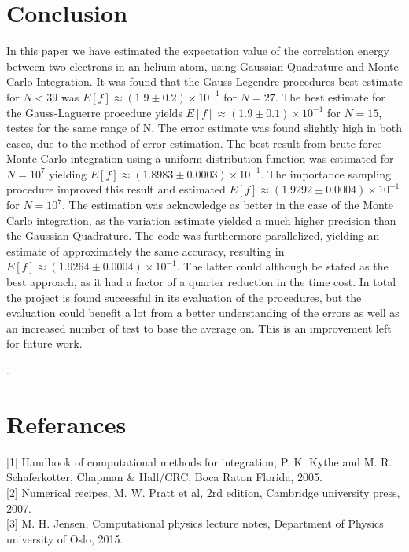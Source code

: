 \documentclass[%
reprint,
amsmath,amssymb,
aps,
]{revtex4-1}
\begin{document}
\section{Conclusion} \noindent 
In this paper we have estimated the expectation value of the correlation energy between two electrons in an helium atom, using Gaussian Quadrature and Monte Carlo Integration. It was found that the Gauss-Legendre procedures best estimate for $N<39$ was $E[f] \approx (1.9 \pm 0.2)\times 10^{-1}$ for $N=27$. The best estimate for the Gauss-Laguerre procedure yields $E[f]\approx (1.9 \pm 0.1)\times 10^{-1}$ for $N=15$, testes for the same range of N. The error estimate was found slightly high in both cases, due to the method of error estimation. The best result from brute force Monte Carlo integration using a uniform distribution function was estimated for $N=10^7$ yielding $E[f]\approx (1.8983 \pm 0.0003)\times 10^{-1}$. The importance sampling procedure improved this result and estimated $E[f]\approx (1.9292 \pm 0.0004)\times 10^{-1}$ for $N=10^7$. The estimation was acknowledge as better in the case of the Monte Carlo integration, as the variation estimate yielded a much higher precision than the Gaussian Quadrature. The code was furthermore parallelized, yielding an estimate of approximately the same accuracy, resulting in $E[f]\approx (1.9264 \pm 0.0004)\times 10^{-1}$. The latter could although be stated as the best approach, as it had a factor of a quarter reduction in the time cost. In total the project is found successful in its evaluation of the procedures, but the evaluation could benefit a lot from a better understanding of the errors as well as an increased number of test to base the average on. This is an improvement left for future work. 

\newpage. \newpage
\onecolumngrid
\section{Referances}
[1] Handbook of computational methods for integration, P. K. Kythe and M. R. Schaferkotter, Chapman \& Hall/CRC, Boca Raton Florida, 2005.\\

[2] Numerical recipes, M. W. Pratt et al, 2rd edition, Cambridge university press, 2007.\\  

[3] M. H. Jensen, Computational physics lecture notes, Department of Physics university of Oslo, 2015. \\
\end{document}
